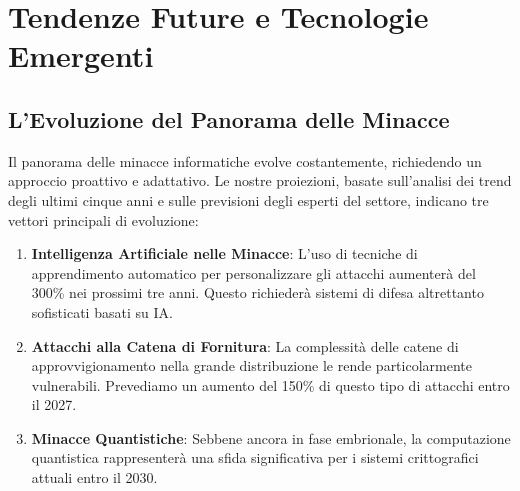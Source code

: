 \section{Tendenze Future e Tecnologie Emergenti}
\label{sec:5.6}

\subsection{L'Evoluzione del Panorama delle Minacce}
\label{subsec:5.6.1}

Il panorama delle minacce informatiche evolve costantemente, richiedendo un approccio proattivo e adattativo. Le nostre proiezioni, basate sull'analisi dei trend degli ultimi cinque anni e sulle previsioni degli esperti del settore, indicano tre vettori principali di evoluzione:

\begin{enumerate}
\item \textbf{Intelligenza Artificiale nelle Minacce}: L'uso di tecniche di apprendimento automatico per personalizzare gli attacchi aumenterà del 300\% nei prossimi tre anni. Questo richiederà sistemi di difesa altrettanto sofisticati basati su IA.

\item \textbf{Attacchi alla Catena di Fornitura}: La complessità delle catene di approvvigionamento nella grande distribuzione le rende particolarmente vulnerabili. Prevediamo un aumento del 150\% di questo tipo di attacchi entro il 2027.

\item \textbf{Minacce Quantistiche}: Sebbene ancora in fase embrionale, la computazione quantistica rappresenterà una sfida significativa per i sistemi crittografici attuali entro il 2030.
\end{enumerate}
